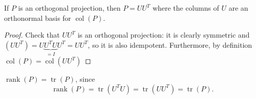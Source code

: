 \documentclass[egregdoesnotlikesansseriftitles,a4paper]{scrartcl}
\begin{document}
\begin{proposition}
      If $P$ is an orthogonal projection, then $P=UU^T$ where the columns of $U$ are an orthonormal basis for $\operatorname{col}(P)$.
      \begin{proof}
            Check that $UU^T$ is an orthogonal projection: it is clearly symmetric and $(UU^T)=U \underbrace{U^TU}_{=I}U^T=UU^T $, so it is also idempotent. Furthermore, by definition $\operatorname{col}(P)=\operatorname{col}(UU^T)$ 
      \end{proof}
\end{proposition}
\begin{remark}
      $\operatorname{rank}(P)=\operatorname{tr}(P) $, since \[
          \operatorname{rank}(P)= \operatorname{tr}(U^TU) =\operatorname{tr}(UU^T) =\operatorname{tr}(P) 
      .\] 
\end{remark}
\end{document}
